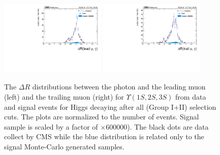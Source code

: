 \begin{figure}[!htbp]
\begin{center}
\includegraphics[width=0.45\textwidth]{figures_and_tables/outputPlots/HtoUpsilon_Cat0_ZZZZZ/nEvts/data_x_mc/withKinCuts/h_withKin_deltaR_Leading_Photon}\hspace*{1.cm}
\includegraphics[width=0.45\textwidth]{figures_and_tables/outputPlots/HtoUpsilon_Cat0_ZZZZZ/nEvts/data_x_mc/withKinCuts/h_withKin_deltaR_Trailing_Photon}\end{center}\vspace*{-.5cm}
\caption{The $\Delta R$ distributions between the photon and the leading muon (left) and the trailing muon (right) for $\Upsilon(1S,2S,3S)$ from data and signal events for Higgs decaying after all (Group I+II) selection cuts. The plots are normalized to the number of events. Signal sample is scaled by a factor of $\times 600000$). The black dots are data collect by CMS while the blue distribution is related only to the signal Monte-Carlo generated samples.}
\label{fig:deltaR_HtoUpsilon_Cat0_groupI_plus_II}
\end{figure}


